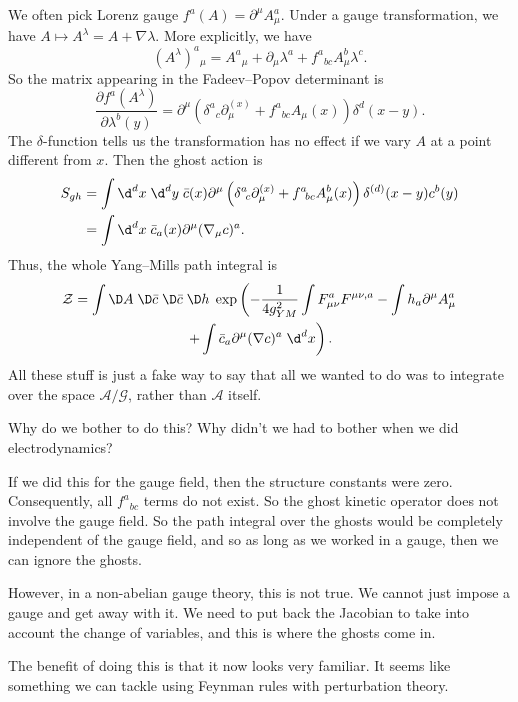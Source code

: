 \documentclass[a4paper]{article}
\begin{document}
\begin{eg}
  We often pick Lorenz gauge $f^a(A) = \partial^\mu A_\mu^a$. Under a gauge transformation, we have $A \mapsto A^\lambda = A + \nabla \lambda$. More explicitly, we have
  \[
    (A^\lambda)^a\!_\mu = A^a\!_\mu + \partial_\mu \lambda^a + f^a\!_{bc} A_\mu^b \lambda^c.
  \]
  So the matrix appearing in the Fadeev--Popov determinant is
  \[
    \frac{\partial f^a(A^\lambda)}{\partial \lambda^b(y)} = \partial^\mu\left(\delta^a\!_c \partial_\mu^{(x)} + f^a\!_{bc} A_\mu(x)\right) \delta^d(x - y).
  \]
  The $\delta$-function tells us the transformation has no effect if we vary $A$ at a point different from $x$. Then the ghost action is
  \begin{align*}
    S_{gh} &= \int \d^d x\; \d^d y\; \bar{c}(x) \partial^\mu\left(\delta^a\!_c \partial_\mu^{(x)} + f^a\!_{bc} A_\mu^b(x)\right) \delta^{(d)}(x - y) c^b(y)\\
    &= \int \d^d x\; \bar{c}_a(x) \partial^\mu (\nabla_\mu c)^a.
  \end{align*}
  Thus, the whole Yang--Mills path integral is
  \begin{multline*}
    \mathcal{Z} = \int \D A\; \D \bar{c}\;\D \bar{c} \;\D h\; \exp\left(-\frac{1}{4g^2_{YM}} \int F_{\mu\nu}^a F^{\mu\nu, a} - \int h_a \partial^\mu A_\mu^a\right.\\
    \left.+ \int \bar{c}_a \partial^\mu(\nabla c)^a \;\d^d x\right).
  \end{multline*}
  All these stuff is just a fake way to say that all we wanted to do was to integrate over the space $\mathcal{A}/\mathcal{G}$, rather than $\mathcal{A}$ itself.
\end{eg}

Why do we bother to do this? Why didn't we had to bother when we did electrodynamics?

If we did this for the gauge field, then the structure constants were zero. Consequently, all $f^a\!_{bc}$ terms do not exist. So the ghost kinetic operator does not involve the gauge field. So the path integral over the ghosts would be completely independent of the gauge field, and so as long as we worked in a gauge, then we can ignore the ghosts.

However, in a non-abelian gauge theory, this is not true. We cannot just impose a gauge and get away with it. We need to put back the Jacobian to take into account the change of variables, and this is where the ghosts come in.

The benefit of doing this is that it now looks very familiar. It seems like something we can tackle using Feynman rules with perturbation theory.
\end{document}

